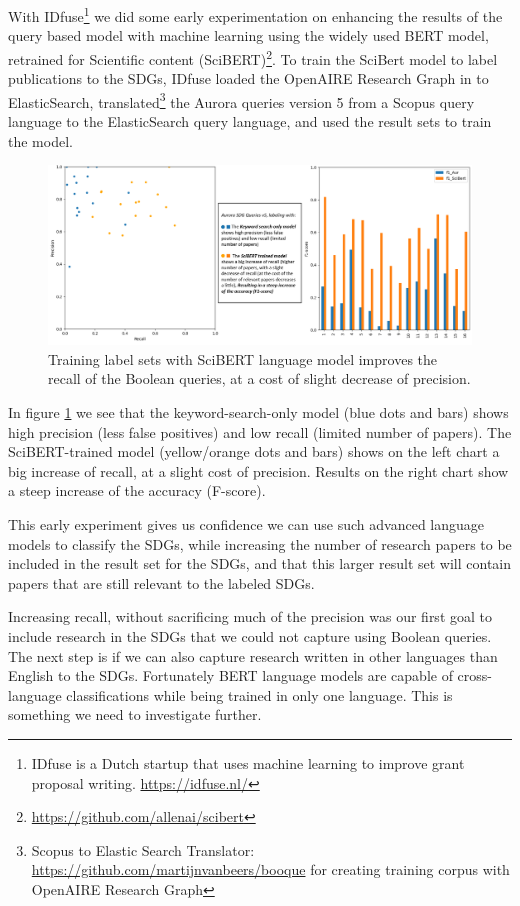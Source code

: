 \documentclass{article}
\begin{document}
With IDfuse\footnote{IDfuse is a Dutch startup that uses machine learning to improve grant proposal writing. \url{https://idfuse.nl/} } we did some early experimentation on enhancing the results of the query based model with machine learning using the widely used BERT model, retrained for Scientific content (SciBERT)\footnote{\url{https://github.com/allenai/scibert}}. 
To train the SciBert model to label publications to the SDGs, IDfuse loaded the OpenAIRE Research Graph in to ElasticSearch, translated\footnote{Scopus to Elastic Search Translator: \url{https://github.com/martijnvanbeers/booque} for creating training corpus with OpenAIRE Research Graph} the Aurora queries version 5 from a Scopus query language to the ElasticSearch query language, and used the result sets to train the model.

\begin{figure}[H]
	\centering
  \includegraphics[width=\textwidth]{figures/BERTmodel-improves-recall.png}
	\caption{Training label sets with SciBERT language model improves the recall of the Boolean queries, at a cost of slight decrease of precision.}
	\label{BERTmodel}
\end{figure}

In figure \ref{BERTmodel} we see that the keyword-search-only model (blue dots and bars) shows high precision (less false positives) and low recall (limited number of papers). The SciBERT-trained model (yellow/orange dots and bars) shows on the left chart a big increase of recall, at a slight cost of precision. Results on the right chart show a steep increase of the accuracy (F-score).

This early experiment gives us confidence we can use such advanced language models to classify the SDGs, while increasing the number of research papers to be included in the result set for the SDGs, and that this larger result set will contain papers that are still relevant to the labeled SDGs.

Increasing recall, without sacrificing much of the precision was our first goal to include research in the SDGs that we could not capture using Boolean queries. The next step is if we can also capture research written in other languages than English to the SDGs. Fortunately BERT language models are capable of cross-language classifications while being trained in only one language. This is something we need to investigate further.
\end{document}
